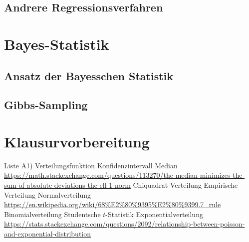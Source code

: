 \subsection{Andrere Regressionsverfahren}

\section{Bayes-Statistik}

\subsection{Ansatz der Bayesschen Statistik}

\subsection{Gibbs-Sampling}

\section{Klausurvorbereitung}
\begin{outline}
\0 Liste A1)
    \1 Verteilungsfunktion
    \1 Konfidenzintervall
    \1 Median  
        \2 \url{https://math.stackexchange.com/questions/113270/the-median-minimizes-the-sum-of-absolute-deviations-the-ell-1-norm}
    \1 Chiquadrat-Verteilung
    \1 Empirische Verteilung
    \1 Normalverteilung
        \2 \url{https://en.wikipedia.org/wiki/68%E2%80%9395%E2%80%9399.7_rule}
    \1 Binomialverteilung
    \1 Studentsche $t$-Statistik
    \1 Exponentialverteilung
        \2 \url{https://stats.stackexchange.com/questions/2092/relationship-between-poisson-and-exponential-distribution}
\end{outline}
